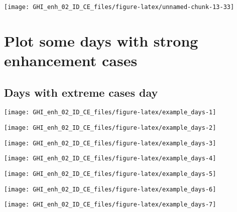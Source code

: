 \documentclass[
  10pt,
  a4paper,oneside]{article}
\begin{document}
\begin{center}\texttt{[image: GHI\_enh\_02\_ID\_CE\_files/figure-latex/unnamed-chunk-13-33]} \end{center}

\FloatBarrier

\hypertarget{plot-some-days-with-strong-enhancement-cases}{%
\section{Plot some days with strong enhancement cases}\label{plot-some-days-with-strong-enhancement-cases}}

\FloatBarrier

\hypertarget{days-with-extreme-cases-day}{%
\subsection{Days with extreme cases day}\label{days-with-extreme-cases-day}}

\begin{center}\texttt{[image: GHI\_enh\_02\_ID\_CE\_files/figure-latex/example\_days-1]} \end{center}

\begin{center}\texttt{[image: GHI\_enh\_02\_ID\_CE\_files/figure-latex/example\_days-2]} \end{center}

\begin{center}\texttt{[image: GHI\_enh\_02\_ID\_CE\_files/figure-latex/example\_days-3]} \end{center}

\begin{center}\texttt{[image: GHI\_enh\_02\_ID\_CE\_files/figure-latex/example\_days-4]} \end{center}

\begin{center}\texttt{[image: GHI\_enh\_02\_ID\_CE\_files/figure-latex/example\_days-5]} \end{center}

\begin{center}\texttt{[image: GHI\_enh\_02\_ID\_CE\_files/figure-latex/example\_days-6]} \end{center}

\begin{center}\texttt{[image: GHI\_enh\_02\_ID\_CE\_files/figure-latex/example\_days-7]} \end{center}
\end{document}
